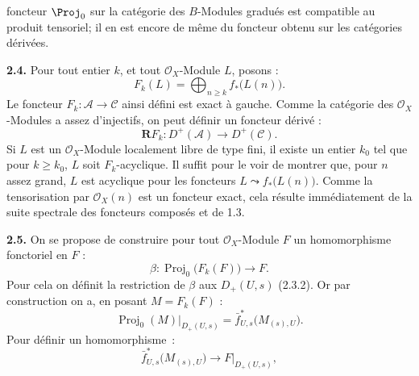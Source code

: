 foncteur \(\Proj_0\) sur la catégorie des \(B\)-Modules gradués est compatible au produit tensoriel; il en est encore de même du foncteur obtenu sur les catégories dérivées.


\textbf{2.4.} Pour tout entier $k$, et tout $\mathcal O_X$-Module $L$, posons :
\begin{equation}\tag{2.4.1}
  F_k(L)=\bigoplus_{n\geq k} f_*\bigl(L(n)\bigr).
\end{equation}
Le foncteur $F_k:\mathcal A\to\mathcal C$ ainsi défini est exact à gauche. Comme la catégorie des $\mathcal O_X$-Modules a assez d'injectifs, on peut définir un foncteur dérivé :
\begin{equation}\tag{2.4.2}
  \mathbf R F_k:D^+(\mathcal A)\longrightarrow D^+(\mathcal C).
\end{equation}
Si $L$ est un $\mathcal O_X$-Module localement libre de type fini, il existe un entier $k_0$ tel que pour $k\geq k_0$, $L$ soit $F_k$-acyclique. Il suffit pour le voir de montrer que, pour $n$ assez grand, $L$ est acyclique pour les foncteurs $L\leadsto f_*\bigl(L(n)\bigr)$. Comme la tensorisation par $\mathcal O_X(n)$ est un foncteur exact, cela résulte immédiatement de la suite spectrale des foncteurs composés et de 1.3.

\textbf{2.5.} On se propose de construire pour tout $\mathcal O_X$-Module $F$ un homomorphisme fonctoriel en $F$ :
\begin{equation}\tag{2.5.1}
  \beta:\operatorname{Proj}_0\bigl(F_k(F)\bigr)\longrightarrow F.
\end{equation}
Pour cela on définit la restriction de $\beta$ aux $D_+(U,s)$ (2.3.2). Or par construction on a, en posant $M=F_k(F)$ :
\[
  \operatorname{Proj}_0(M)|_{D_+(U,s)}
  =\bar f^{*}_{U,s}\bigl(M_{(s),U}\bigr).
\]
Pour définir un homomorphisme~:
\[
  \bar f^{*}_{U,s}\bigl(M_{(s),U}\bigr)\longrightarrow F|_{D_+(U,s)},
\]
